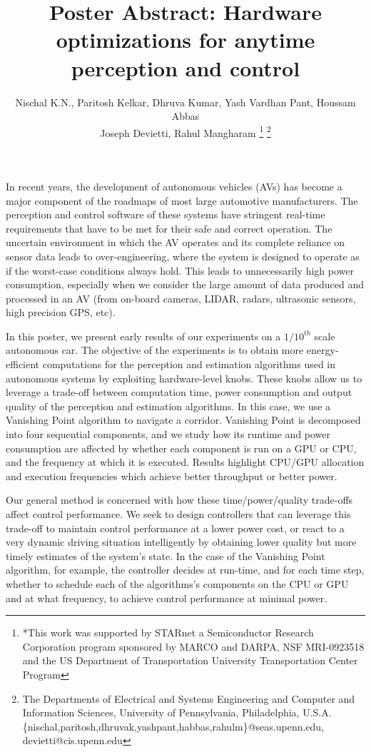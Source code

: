 \documentclass[a4paper, 10pt, conference]{ieeeconf}      %
\title{\LARGE \bf
	Poster Abstract: Hardware optimizations for anytime perception and control
}
\author{ Nischal K.N., Paritosh Kelkar, Dhruva Kumar, Yash Vardhan Pant, Houssam Abbas\\
	Joseph Devietti, Rahul Mangharam%
	\thanks{*This work was supported by STARnet a Semiconductor Research
		Corporation program sponsored by MARCO and DARPA, NSF MRI-0923518 and the US Department of Transportation University Transportation Center Program}%
	\thanks{The Departments of Electrical and Systems Engineering and Computer and Information Sciences, University of Pennsylvania, Philadelphia, U.S.A.
		{\small
			 \{nischal,paritosh,dhruvak,yashpant,habbas,rahulm\}@seas.upenn.edu, devietti@cis.upenn.edu}}%
}
\begin{document}
	
\maketitle
\thispagestyle{empty}
\pagestyle{empty}

In recent years, the development of autonomous vehicles (AVs) has become a major component of the roadmaps of most large automotive manufacturers. 
The perception and control software of these systems have stringent real-time requirements that have to be met for their safe and correct operation.
The uncertain environment in which the AV operates and its complete reliance on sensor data leads to over-engineering, where the system is designed to operate as if the worst-case conditions always hold.
This leads to unnecessarily high power consumption, especially when we consider the large amount of data produced and processed in an AV (from on-board cameras, LIDAR, radars, ultrasonic sensors, high precision GPS, etc). 

In this poster, we present early results of our experiments on a $1/10^{th}$ scale autonomous car. 
The objective of the experiments is to obtain more energy-efficient computations for the perception and estimation algorithms used in autonomous systems by exploiting hardware-level knobs. 
These knobs allow us to leverage a trade-off between computation time, power consumption and output quality of the perception and estimation algorithms. 
In this case, we use a Vanishing Point algorithm to navigate a corridor. 
Vanishing Point is decomposed into four sequential components, and we study how its runtime and power consumption are affected by whether each component is run on a GPU or CPU, and the frequency at which it is executed.
Results highlight CPU/GPU allocation and execution frequencies which achieve better throughput or better power.

Our general method is concerned with how these time/power/quality trade-offs affect control performance. 
We seek to design controllers that can leverage this trade-off to maintain control performance at a lower power cost, or react to a very dynamic driving situation intelligently by obtaining lower quality but more timely estimates of the system's state.   
In the case of the Vanishing Point algorithm, for example, the controller decides at run-time, and for each time step, whether to schedule each of the algorithms's components on the CPU or GPU and at what frequency, to achieve control performance at minimal power.
	
\end{document}
